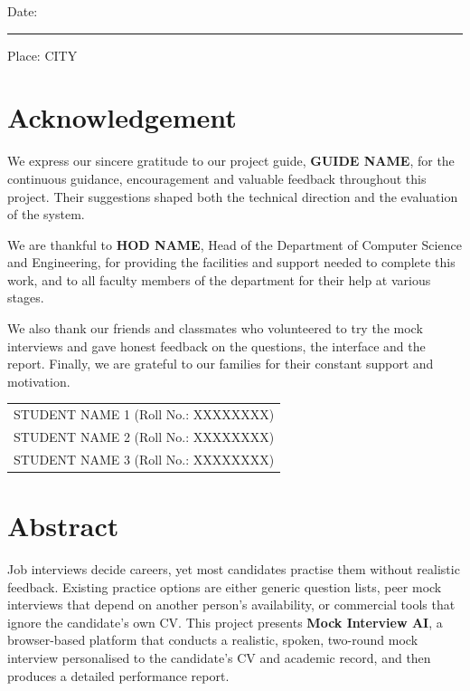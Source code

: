 \documentclass[12pt,a4paper,oneside]{report}
\newcommand{\studentnames}{STUDENT NAME 1 \quad (Roll No.: XXXXXXXX)\\ STUDENT NAME 2 \quad (Roll No.: XXXXXXXX)\\ STUDENT NAME 3 \quad (Roll No.: XXXXXXXX)}
\newcommand{\department}{Department of Computer Science and Engineering}
\newcommand{\city}{CITY}
\newcommand{\guide}{GUIDE NAME}
\newcommand{\hod}{HOD NAME}
\begin{document}
\vspace{1.5cm}
\noindent Date: \rule{3.5cm}{0.4pt} \hfill Place: \city

\chapter*{Acknowledgement}
\thispagestyle{plain}

We express our sincere gratitude to our project guide, \textbf{\guide}, for the continuous guidance, encouragement and valuable feedback throughout this project. Their suggestions shaped both the technical direction and the evaluation of the system.

We are thankful to \textbf{\hod}, Head of the \department, for providing the facilities and support needed to complete this work, and to all faculty members of the department for their help at various stages.

We also thank our friends and classmates who volunteered to try the mock interviews and gave honest feedback on the questions, the interface and the report. Finally, we are grateful to our families for their constant support and motivation.

\vspace{2cm}
\noindent\begin{tabular}{@{}l@{}}
\studentnames
\end{tabular}

\chapter*{Abstract}
\thispagestyle{plain}

Job interviews decide careers, yet most candidates practise them without realistic feedback. Existing practice options are either generic question lists, peer mock interviews that depend on another person's availability, or commercial tools that ignore the candidate's own CV. This project presents \textbf{Mock Interview AI}, a browser-based platform that conducts a realistic, spoken, two-round mock interview personalised to the candidate's CV and academic record, and then produces a detailed performance report.
\end{document}
